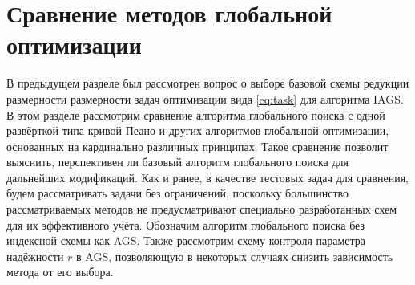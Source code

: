 \section{Сравнение методов глобальной оптимизации}

В предыдущем разделе был рассмотрен вопрос о выборе базовой схемы редукции размерности размерности задач оптимизации вида \ref{eq:task} для
алгоритма IAGS. В этом разделе рассмотрим сравнение алгоритма глобального поиска с одной развёрткой типа кривой Пеано
и других алгоритмов глобальной оптимизации, основанных на кардинально различных принципах. Такое сравнение позволит
выяснить, перспективен ли базовый алгоритм глобального поиска для дальнейших модификаций.
Как и ранее, в качестве тестовых задач для сравнения, будем рассматривать задачи без ограничений, поскольку большинство рассматриваемых методов
не предусматривают специально разработанных схем для их эффективного учёта.
Обозначим алгоритм глобального поиска без индексной схемы как AGS. Также рассмотрим схему контроля
параметра надёжности \(r\) в AGS, позволяющую в некоторых случаях снизить зависимость метода от его выбора.

